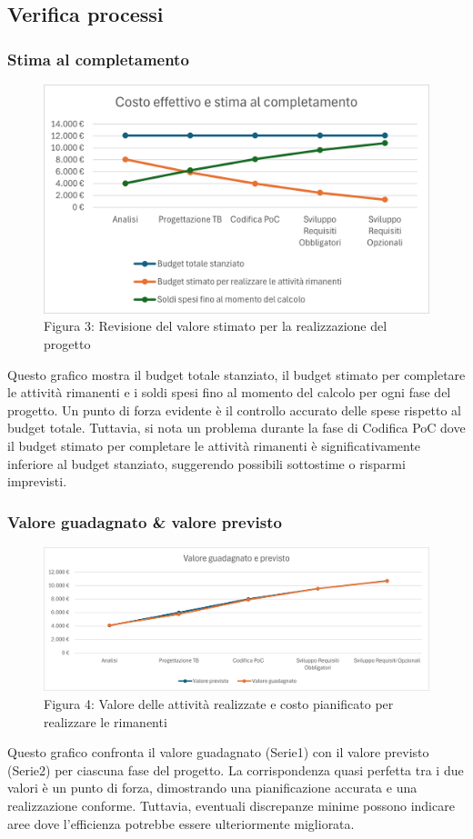 \documentclass{article}
\begin{document}
\subsection{Verifica processi}
\subsubsection{Stima al completamento}
\begin{figure}[H]
    \centering
    \includegraphics{documenti/grafici/CostoEffettivoEStimaAlCompletamentoPB.png}
    \caption{Figura 3: Revisione del valore stimato per la realizzazione del progetto}
    \end{figure}
    Questo grafico mostra il budget totale stanziato, il budget stimato per completare le attività rimanenti e i soldi spesi fino al momento del calcolo per ogni fase del progetto. Un punto di forza evidente è il controllo accurato delle spese rispetto al budget totale. Tuttavia, si nota un problema durante la fase di Codifica PoC dove il budget stimato per completare le attività rimanenti è significativamente inferiore al budget stanziato, suggerendo possibili sottostime o risparmi imprevisti.
\subsubsection{Valore guadagnato \& valore previsto}
\begin{figure}[H]
    \centering
    \includegraphics[width=\textwidth]{documenti/grafici/ValoreGuadagnatoEPrevistoPB1.png}
    \caption{Figura 4: Valore delle attività realizzate e costo pianificato per realizzare le rimanenti}
    \end{figure}
    Questo grafico confronta il valore guadagnato (Serie1) con il valore previsto (Serie2) per ciascuna fase del progetto. La corrispondenza quasi perfetta tra i due valori è un punto di forza, dimostrando una pianificazione accurata e una realizzazione conforme. Tuttavia, eventuali discrepanze minime possono indicare aree dove l'efficienza potrebbe essere ulteriormente migliorata.
\end{document}
